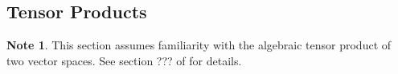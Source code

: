 \documentclass[12pt]{amsart}
\theoremstyle{definition}
\newtheorem{defn}[definition]{Definition}
\newtheorem{note}[definition]{Note}
\newcommand{\del}{\delta}
\newcommand{\N}{\mathbb{N}}
\newcommand{\ld}[1]{\label{defn:#1}}
\begin{document}
%
%



















\newpage
	\subsection{Tensor Products}
	
	\begin{note}
	This section assumes familiarity with the algebraic tensor product of two vector spaces. See section ??? of \cite{algebra} for details. 
	\end{note}	
	
\end{document}
